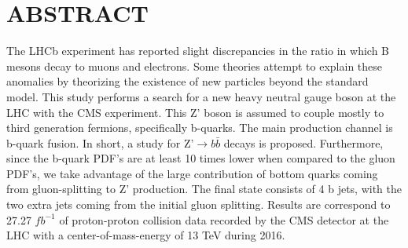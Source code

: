 %
%
%
%

\chapter*{ABSTRACT}

\pagestyle{plain} %
\setcounter{page}{2}

\indent The LHCb experiment has reported slight discrepancies in the ratio in which B mesons decay to muons and electrons. Some theories attempt to explain these anomalies by theorizing the existence of new particles beyond the standard model. This study performs a search for a new heavy neutral gauge boson at the LHC with the CMS experiment. This Z' boson is assumed to couple mostly to third generation fermions, specifically b-quarks. The main production channel is b-quark fusion. In short, a study for Z'$\rightarrow b\bar{b}$ decays is proposed. Furthermore, since the b-quark PDF's are at least 10 times lower when compared to the gluon PDF's, we take advantage of the large contribution of bottom quarks coming from gluon-splitting to Z' production.  The final state consists of 4 b jets, with the two extra jets coming from the initial gluon splitting. Results are correspond to 27.27 $fb^{-1}$ of proton-proton collision data recorded by the CMS detector at the LHC with a center-of-mass-energy of 13 TeV during 2016.


 

\pagebreak{}
